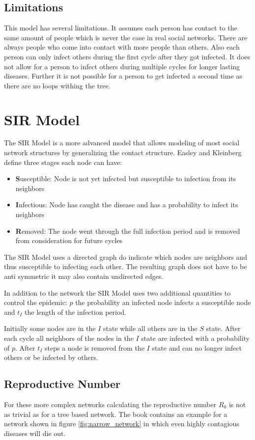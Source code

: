 \subsection{Limitations}
This model has several limitations. It assumes each person has contact to the same amount of
people which is never the case in real social networks. There are always people who come into
contact with more people than others. Also each person can only infect others during the
first cycle after they got infected. It does not allow for a person to infect others during
multiple cycles for longer lasting diseases. Further it is not possible for a person
to get infected a second time as there are no loops withing the tree.

\section{SIR Model}
The SIR Model is a more advanced model that allows modeling of most social network structures
by generalizing the contact structure. Easley and Kleinberg \cite{networks} define three 
stages each node can have:
\begin{itemize}
    \item \textbf{S}usceptible: Node is not yet infected but susceptible to infection from its neighbors
    \item \textbf{I}nfectious: Node has caught the disease and has a probability to infect its neighbors
    \item \textbf{R}emoved: The node went through the full infection period and is removed from consideration for future cycles
\end{itemize}
The SIR Model uses a directed graph do indicate which nodes are neighbors and thus susceptible 
to infecting each other. The resulting graph does not have to be anti symmetric it may also contain
undirected edges. 

In addition to the network the SIR Model uses two additional quantities to control the 
epidemic: $p$ the probability an infected node infects a susceptible node and $t_I$ the length
of the infection period.

Initially some nodes are in the $I$ state while all others are in the $S$ state. After
each cycle all neighbors of the nodes in the $I$ state are infected with a probability of $p$.
After $t_I$ steps a node is removed from the $I$ state and can no longer infect others or be
infected by others.

\subsection{Reproductive Number}
For these more complex networks calculating the reproductive number $R_0$ is not as trivial
as for a tree based network. The book contains an example for a network shown in figure \ref{fig:narrow_network}
in which even highly contagious diseases will die out.


